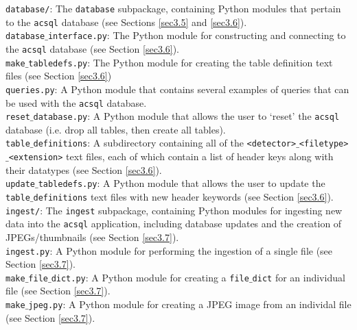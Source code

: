 \documentclass[10pt,journal,compsoc]{IEEEtran}
\begin{document}
\noindent\texttt{database/}: The \texttt{database} subpackage, containing Python modules that pertain to the \texttt{acsql} database (see Sections \ref{sec3.5} and \ref{sec3.6}).\\

\noindent\texttt{database$\_$interface.py}: The Python module for constructing and connecting to the \texttt{acsql} database (see Section \ref{sec3.6}). \\

\noindent\texttt{make$\_$tabledefs.py}: The Python module for creating the table definition text files (see Section \ref{sec3.6}) \\

\noindent\texttt{queries.py}: A Python module that contains several examples of queries that can be used with the \texttt{acsql} database.\\

\noindent\texttt{reset$\_$database.py}: A Python module that allows the user to `reset' the \texttt{acsql} database (i.e. drop all tables, then create all tables).\\

\noindent\texttt{table$\_$definitions}: A subdirectory containing all of the \texttt{<detector>$\_$<filetype>$\_$<extension>} text files, each of which contain a list of header keys along with
their datatypes (see Section \ref{sec3.6}).\\

\noindent\texttt{update$\_$tabledefs.py}: A Python module that allows the user to update the \texttt{table$\_$definitions} text files with new header keywords (see Section \ref{sec3.6}).\\

\noindent\texttt{ingest/}: The \texttt{ingest} subpackage, containing Python modules for ingesting new data into the \texttt{acsql} application, including database updates and the creation of
JPEGs/thumbnails (see Section \ref{sec3.7}).\\

\noindent\texttt{ingest.py}: A Python module for performing the ingestion of a single file (see Section \ref{sec3.7}).\\

\noindent\texttt{make$\_$file$\_$dict.py}: A Python module for creating a \texttt{file$\_$dict} for an individual file (see Section \ref{sec3.7}).\\

\noindent\texttt{make$\_$jpeg.py}: A Python module for creating a JPEG image from an individal file (see Section \ref{sec3.7}).\\
\end{document}
